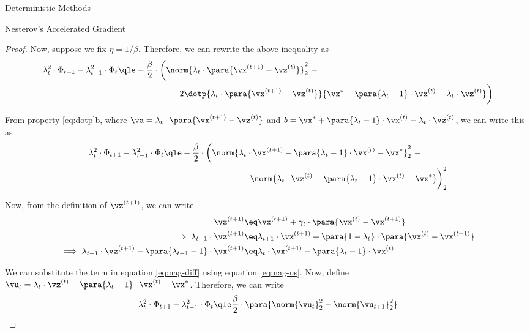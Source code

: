 \documentclass{article}
\newcommand{\x}[1]{\vx^{(#1)}}
\newcommand{\xs}{\vx^{\ast}}
\newcommand{\z}[1]{\vz^{(#1)}}
\begin{document}
\begin{psection}{Deterministic Methods}
\begin{psubsection}{Nesterov's Accelerated Gradient}
\begin{theorem}
\begin{proof}
				Now, suppose we fix $\eta = 1 / \beta$. Therefore, we can rewrite the above inequality as
				\begin{align*}
					\lambda_t^2 \cdot \Phi_{t + 1} - \lambda_{t - 1}^2 \cdot \Phi_{t}	&\qle	- \frac{\beta}{2} \cdot \bigg( \norm{\lambda_t \cdot \para{\x{t + 1} - \z{t}}}_2^2 \ - \\
					&\hspace{2cm} - \ 2 \dotp{\lambda_t \cdot \para{\x{t+1} - \z{t}}}{\xs + \para{\lambda_t - 1} \cdot \x{t} - \lambda_t \cdot \z{t}} \bigg)
				\end{align*}

				From property \hyperref[eq:dotp]{\ref*{eq:dotp}b}, where $\va = \lambda_t \cdot \para{\x{t + 1} - \z{t}}$ and $b = \xs + \para{\lambda_t - 1} \cdot \x{t} - \lambda_t \cdot \z{t}$, we can write this as
				\begin{align}
					\lambda_t^2 \cdot \Phi_{t + 1} - \lambda_{t - 1}^2 \cdot \Phi_{t}	&\qle	- \frac{\beta}{2} \cdot \bigg( \norm{\lambda_t \cdot \x{t + 1} - \para{\lambda_t - 1} \cdot \x{t} - \xs}_2^2 \ - \nonumber \\
					&\hspace{3cm} - \ \norm{\lambda_t \cdot \z{t} - \para{\lambda_t - 1} \cdot \x{t} - \xs} \bigg)_2^2
					\label{eq:nag-diff}
				\end{align}

				Now, from the definition of $\z{t + 1}$, we can write
				\begin{align}
					\z{t + 1}	&\eq	\x{t + 1} + \gamma_t \cdot \para{\x{t} - \x{t + 1}} \nonumber \\
					\implies \lambda_{t + 1} \cdot \z{t + 1}	&\eq	\lambda_{t + 1} \cdot \x{t + 1} + \para{1 - \lambda_t} \cdot \para{\x{t } - \x{t + 1}} \nonumber \\
					\implies \lambda_{t + 1} \cdot \z{t + 1} - \para{\lambda_{t + 1} - 1} \cdot \x{t + 1}	&\eq	\lambda_t \cdot \x{t + 1} - \para{\lambda_t - 1} \cdot \x{t} \label{eq:nag-us}
				\end{align}

				We can substitute the term in equation \ref{eq:nag-diff} using equation \ref{eq:nag-us}. Now, define $\vu_t = \lambda_t \cdot \z{t} - \para{\lambda_t - 1} \cdot \x{t} - \xs$. Therefore, we can write
				\begin{align*}
					\lambda_t^2 \cdot \Phi_{t + 1} - \lambda_{t - 1}^2 \cdot \Phi_{t}	\qle	\frac{\beta}{2} \cdot \para{\norm{\vu_t}_2^2 - \norm{\vu_{t + 1}}_2^2}
				\end{align*}


\end{proof}
\end{theorem}
\end{psubsection}
\end{psection}
\end{document}
